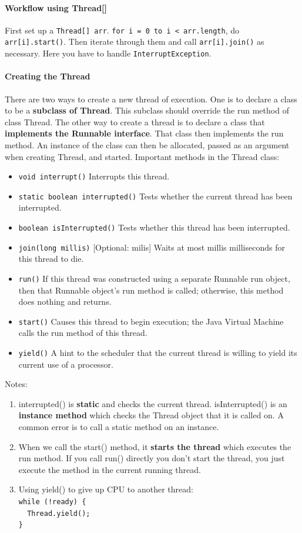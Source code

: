 \documentclass{article}
\begin{document}
\paragraph{Workflow using Thread[]} First set up a \lstinline{Thread[] arr}. \lstinline{for i = 0 to i < arr.length}, do \lstinline{arr[i].start()}. Then iterate through them and call \lstinline{arr[i].join()} as necessary. Here you have to handle \lstinline{InterruptException}.

\paragraph{Creating the Thread} There are two ways to create a new thread of execution. One is to declare a class to be a \textbf{subclass of Thread}. This subclass should override the run method of class Thread. The other way to create a thread is to declare a class that \textbf{implements the Runnable interface}. That class then implements the run method. An instance of the class can then be allocated, passed as an argument when creating Thread, and started. Important methods in the Thread class:
\begin{itemize}
    \item \lstinline{void interrupt()} Interrupts this thread.
    \item \lstinline{static boolean interrupted()} Tests whether the current thread has been interrupted.
    \item \lstinline{boolean isInterrupted()} Tests whether this thread has been interrupted.
    \item \lstinline{join(long millis)} [Optional: milis] Waits at most millis milliseconds for this thread to die.
    \item \lstinline{run()} If this thread was constructed using a separate Runnable run object, then that Runnable object's run method is called; otherwise, this method does nothing and returns.
    \item \lstinline{start()} Causes this thread to begin execution; the Java Virtual Machine calls the run method of this thread.
    \item \lstinline{yield()} A hint to the scheduler that the current thread is willing to yield its current use of a processor.
\end{itemize}
Notes:
\begin{enumerate}
    \item interrupted() is \textbf{static} and checks the current thread. isInterrupted() is an \textbf{instance method} which checks the Thread object that it is called on. A common error is to call a static method on an instance.
    \item When we call the start() method, it \textbf{starts the thread} which executes the run method. If you call run() directly you don't start the thread, you just execute the method in the current running thread.
    \item Using yield() to give up CPU to another thread:\\
        \lstinline|while (!ready) {|\\
        \lstinline|  Thread.yield();|\\
        \lstinline|}|
\end{enumerate}
\end{document}

